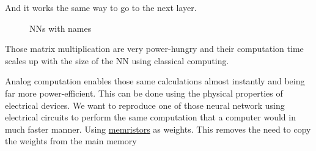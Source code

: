 And it works the same way to go to the next layer.

\begin{figure}[h!]
  \centering
  
  \caption{\aclp{NN} with names}
  \label{fig:nn_explained}
\end{figure}

Those matrix multiplication are very power-hungry and their computation time scales up with the size of the \ac{NN} using classical computing.

Analog computation enables those same calculations almost instantly and being far more power-efficient. This can be done using the physical properties of electrical devices.
We want to reproduce one of those neural network using electrical circuits to perform the same computation that a computer would in much faster manner.
Using \hyperref[subsec:memristors]{memristors} as weights. This removes the need to copy the weights from the main memory
